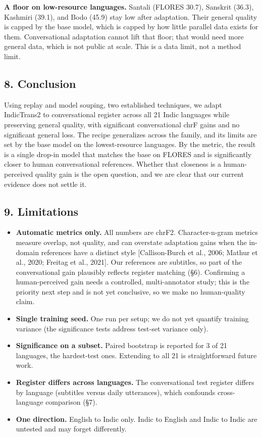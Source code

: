 \documentclass[
  11pt,
]{article}
\providecommand{\tightlist}{%
  \setlength{\itemsep}{0pt}\setlength{\parskip}{0pt}}
\begin{document}
\textbf{A floor on low-resource languages.} Santali (FLORES 30.7),
Sanskrit (36.3), Kashmiri (39.1), and Bodo (45.9) stay low after
adaptation. Their general quality is capped by the base model, which is
capped by how little parallel data exists for them. Conversational
adaptation cannot lift that floor; that would need more general data,
which is not public at scale. This is a data limit, not a method limit.

\hypertarget{conclusion}{%
\subsection{8. Conclusion}\label{conclusion}}

Using replay and model souping, two established techniques, we adapt
IndicTrans2 to conversational register across all 21 Indic languages
while preserving general quality, with significant conversational chrF
gains and no significant general loss. The recipe generalizes across the
family, and its limits are set by the base model on the lowest-resource
languages. By the metric, the result is a single drop-in model that
matches the base on FLORES and is significantly closer to human
conversational references. Whether that closeness is a human-perceived
quality gain is the open question, and we are clear that our current
evidence does not settle it.

\hypertarget{limitations}{%
\subsection{9. Limitations}\label{limitations}}

\begin{itemize}
\tightlist
\item
  \textbf{Automatic metrics only.} All numbers are chrF2.
  Character-n-gram metrics measure overlap, not quality, and can
  overstate adaptation gains when the in-domain references have a
  distinct style {[}Callison-Burch et al., 2006; Mathur et al., 2020;
  Freitag et al., 2021{]}. Our references are subtitles, so part of the
  conversational gain plausibly reflects register matching (§6).
  Confirming a human-perceived gain needs a controlled, multi-annotator
  study; this is the priority next step and is not yet conclusive, so we
  make no human-quality claim.
\item
  \textbf{Single training seed.} One run per setup; we do not yet
  quantify training variance (the significance tests address test-set
  variance only).
\item
  \textbf{Significance on a subset.} Paired bootstrap is reported for 3
  of 21 languages, the hardest-test ones. Extending to all 21 is
  straightforward future work.
\item
  \textbf{Register differs across languages.} The conversational test
  register differs by language (subtitles versus daily utterances),
  which confounds cross-language comparison (§7).
\item
  \textbf{One direction.} English to Indic only. Indic to English and
  Indic to Indic are untested and may forget differently.
\end{itemize}
\end{document}
